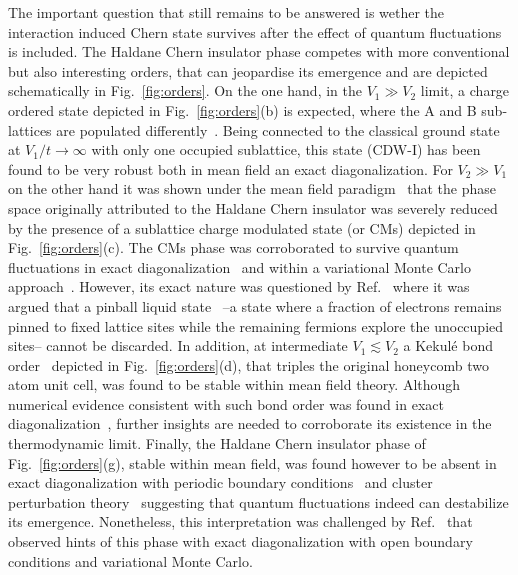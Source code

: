 \documentclass[aps,prx,10pt,twocolumn,floatfix,superscriptaddress,showpacs,numerical,footinbib]{revtex4-1}
\begin{document}
The important question that still remains to be answered is wether the interaction induced Chern state survives 
after the effect of quantum fluctuations is included.
%
The Haldane Chern insulator phase competes with more conventional but also interesting orders, 
that can jeopardise its emergence and are depicted schematically in Fig.~\ref{fig:orders}.
%
On the one hand, in the $V_{1} \gg V_{2}$ limit, a charge ordered state depicted in Fig.~\ref{fig:orders}(b) is expected, 
where the A and B sub-lattices are populated differently~\cite{RQHZ08,WCT14}.
%
Being connected to the classical ground state at $V_{1}/t \to \infty$ with only one occupied sublattice, this state (CDW-I) has been found to be very robust both in mean field an exact diagonalization.
%
For $V_{2}\gg V_{1}$ on the other hand it was shown under the mean field paradigm~\cite{GCC13} that the phase space originally attributed to the Haldane Chern insulator 
was severely reduced by the presence of a sublattice charge modulated state (or CMs) depicted in Fig.~\ref{fig:orders}(c).
%
The CMs phase was corroborated to survive quantum fluctuations in exact diagonalization~\cite{GGNVC13,DCH14} and within a variational Monte Carlo approach~\cite{DCH14}.
%
However, its exact nature was questioned by Ref.~\cite{DH14} where it was argued that a pinball liquid state~\cite{HF06,MRF13} --a state where a fraction of electrons remains pinned to fixed lattice sites while the remaining fermions explore the unoccupied sites-- cannot be discarded. 
%
In addition, at intermediate $V_{1}\lesssim V_{2}$ a Kekul\'e bond order~\cite{C00,HCM07,WF10,RH10,RJH13} depicted in Fig.~\ref{fig:orders}(d), that triples the original honeycomb two atom unit cell, 
was found to be stable within mean field theory.
%
Although numerical evidence consistent with such bond order was found in exact diagonalization~\cite{GGNVC13}, further insights are needed to corroborate its existence in the thermodynamic limit.
%
Finally, the Haldane Chern insulator phase of Fig.~\ref{fig:orders}(g), stable within mean field, was found however to be absent in exact diagonalization with periodic boundary conditions~\cite{GGNVC13,DH14} and cluster perturbation theory~\cite{DH14} suggesting that quantum fluctuations indeed can destabilize its emergence.
%
Nonetheless, this interpretation was challenged by Ref.~\cite{DCH14} that observed hints of this phase with exact diagonalization with open boundary conditions and variational Monte Carlo.\\
\end{document}
